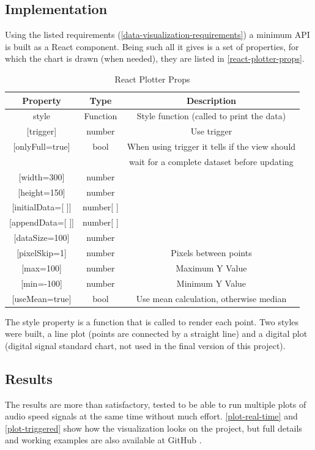 \subsection{Implementation}
Using the listed requirements (\autoref{data-visualization-requirements}) a minimum
API is built as a React component. Being such all it gives is a set of properties,
for which the chart is drawn (when needed), they are listed in \autoref{react-plotter-props}.
\begin{table}[htb]
  \ABNTEXreducedfont
  \caption[React Plotter Props]{React Plotter Props}
  \label{react-plotter-props}
  \centering
  \begin{tabular}{c|c|c}
    \textbf{Property} & \textbf{Type} & \textbf{Description} \\
    \hline \hline
    style &	Function & Style function (called to print the data) \\
    \hline
    {[trigger]} &	number & Use trigger \\
    \hline
    {[onlyFull=true]}	& bool & When using trigger it tells if the view should \\
                      &      & wait for a complete dataset before updating \\
    \hline
    {[width=300]} &	number \\
    \hline
    {[height=150]} & number \\
    \hline
    {[initialData=[ ]]} & number{[ ]} \\
    \hline
    {[appendData=[ ]]} & number{[ ]} \\
    \hline
    {[dataSize=100]} & number \\
    \hline
    {[pixelSkip=1]} &	number &	Pixels between points \\
    \hline
    {[max=100]} &	number & Maximum Y Value \\
    \hline
    {[min=-100]} & number & Minimum Y Value \\
    \hline
    {[useMean=true]} & bool & Use mean calculation, otherwise median  \\
  \end{tabular}
\end{table}
The style property is a function that is called to render each point. Two styles
were built, a line plot (points are connected by a straight line) and a digital
plot (digital signal standard chart, not used in the final version of this project).

\subsection{Results}
The results are more than satisfactory, tested to be able to run multiple plots
of audio speed signals at the same time without much effort. \autoref{plot-real-time}
and \autoref{plot-triggered} show how the visualization looks on the
project, but full details and working examples are also available at GitHub
\cite{react-plotter}.

